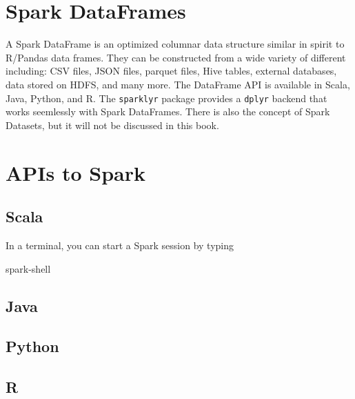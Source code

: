 \documentclass[]{book}
\newenvironment{Shaded}{\begin{snugshade}}{\end{snugshade}}
\newcommand{\ExtensionTok}[1]{#1}
\theoremstyle{definition}
\theoremstyle{definition}
\theoremstyle{definition}
\theoremstyle{remark}
\begin{document}
\hypertarget{spark-dataframes}{%
\section{Spark DataFrames}\label{spark-dataframes}}

A Spark DataFrame is an optimized columnar data structure similar in
spirit to R/Pandas data frames. They can be constructed from a wide
variety of different including: CSV files, JSON files, parquet files,
Hive tables, external databases, data stored on HDFS, and many more. The
DataFrame API is available in Scala, Java, Python, and R. The
\texttt{sparklyr} package provides a \texttt{dplyr} backend that works
seemlessly with Spark DataFrames. There is also the concept of Spark
Datasets, but it will not be discussed in this book.

\hypertarget{apis-to-spark}{%
\section{APIs to Spark}\label{apis-to-spark}}

\hypertarget{scala}{%
\subsection{Scala}\label{scala}}

In a terminal, you can start a Spark session by typing

\begin{Shaded}
\begin{Highlighting}[]
\ExtensionTok{spark-shell}
\end{Highlighting}
\end{Shaded}

\hypertarget{java}{%
\subsection{Java}\label{java}}

\hypertarget{python}{%
\subsection{Python}\label{python}}

\hypertarget{r}{%
\subsection{R}\label{r}}
\end{document}
